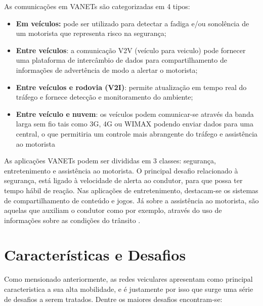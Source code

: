 \documentclass[
	12pt,				%
	oneside,			%
	a4paper,			%
	english,			%
	brazil				%
	]{abntex2ppgsi}
\begin{document}
As comunicações em VANETs são categorizadas em 4 tipos:
\begin{itemize}
	\item {\textbf{Em veículos:} pode ser utilizado para detectar a fadiga e/ou sonolência de um motorista que representa  risco na segurança;}
	\item {\textbf{Entre veículos}: a comunicação V2V (veículo para veiculo) pode fornecer uma plataforma de intercâmbio de dados para compartilhamento de informações de advertência de modo a alertar o motorista;}
	\item {\textbf{Entre veículos e rodovia (V2I)}: permite atualização em tempo real do tráfego e fornece detecção e monitoramento do ambiente;}
	\item {\textbf{Entre veículo e nuvem}: os veículos podem comunicar-se através da banda larga sem fio tais como 3G, 4G ou WIMAX podendo enviar dados para uma central, o que permitiria um controle mais abrangente do tráfego e assistência ao motorista}
\end{itemize}


As aplicações VANETs podem ser divididas em 3 classes: segurança, entretenimento e assistência ao motorista. O principal desafio relacionado à segurança, está ligado à velocidade de alerta ao condutor, para que possa ter tempo hábil de reação. Nas aplicações de entretenimento, destacam-se os sistemas de compartilhamento de conteúdo e jogos. Já sobre a assistência ao motorista, são aquelas que auxiliam o condutor como por exemplo, através do uso de informações sobre as condições do trânsito \cite{souzasoaressbrc}.

\section{Características e Desafios}


Como mensionado anteriormente, as redes veiculares apresentam como principal caracteristica a sua alta mobilidade, e é justamente por isso que surge uma série de desafios a serem tratados. Dentre os maiores desafios encontram-se:
\end{document}
